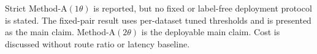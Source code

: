 Strict Method-A$(1\theta)$ is reported, but no fixed or label-free deployment protocol is stated.
The fixed-pair result uses per-dataset tuned thresholds and is presented as the main claim.
Method-A$(2\theta)$ is the deployable main claim.
Cost is discussed without route ratio or latency baseline.

